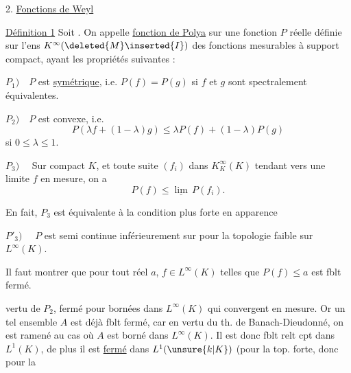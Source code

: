 2. \uline{Fonctions de Weyl}


\uline{Définition 1} Soit  \inserted{\(I=]0,\omega[\quad(0<\omega\le+\infty)\)}. On appelle \uline{fonction de Polya} sur  une fonction \(P\) réelle définie sur l'ens \(K^\infty(\deleted{M}\inserted{I})\) des fonctions mesurables à support compact, ayant les propriétés suivantes :


\(P_1)\quad P\) est \uline{symétrique}, i.e. \(P(f)=P(g)\) si \(f\) et \(g\) sont spectralement équivalentes.

\(P_2)\quad P\) est convexe, i.e.
\[
P(\lambda f+(1-\lambda)g)\le\lambda P(f)+(1-\lambda)P(g)
\]
si \(0\le\lambda\le1\).

\(P_3)\quad\) Sur  compact \(K\),  et toute suite \((f_i)\) dans \(K^\infty_K(K)\) tendant vers une  limite \(f\) en mesure, on a
\[
P(f)\le\underline{\lim}\,P(f_i).
\]

En fait, \(P_3\) est équivalente à la condition plus forte en apparence

\(P'_3)\quad\)  \(P\) est semi continue inférieurement sur  pour la topologie faible sur \(L^\infty(K)\).

Il faut montrer que pour tout réel \(a\), \deleted{\(P^{-1}(]-\infty,a[)\)}   \(f\in L^\infty(K)\) telles que \(P(f)\le a\) est fblt fermé.



 vertu de \(P_2\),   fermé pour  bornées dans \(L^\infty(K)\) qui convergent en mesure. Or un tel ensemble \(A\) est déjà fblt fermé, car en vertu du th. de Banach-Dieudonné, on est ramené au cas où \(A\) est borné dans \(L^\infty(K)\). Il est donc fblt relt cpt dans \(L^1(K)\),  de plus il est \uline{fermé} dans \(L^1(\unsure{k|K})\) (pour la top. forte, donc pour la

